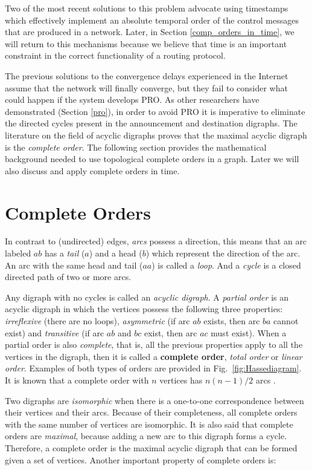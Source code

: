 \documentclass[5p,twocolumn]{elsarticle}
\begin{document}
Two of the most recent solutions to this problem \cite{Pei2005, Chandrashekar2005} advocate using timestamps which effectively implement an absolute temporal order of the control messages that are produced in a network. Later, in Section \ref{comp_orders_in_time}, we will return to this mechanisms because we believe that time is an important constraint in the correct functionality of a routing protocol.

The previous solutions to the convergence delays experienced in the Internet assume that the network will finally converge, but they fail to consider what could happen if the system develops PRO. As other researchers have demonstrated (Section \ref{pro}), in order to avoid PRO it is imperative to eliminate the directed cycles present in the announcement and destination digraphs. The literature on the field of acyclic digraphs \cite{Harary1965, Bang-Jensen2002} proves that the maximal acyclic digraph is the \emph{complete order}. The following section provides the mathematical background needed to use topological complete orders in a graph. Later we will also discuss and apply complete orders in time.




\section{Complete Orders}\label{comp_orders}
In contrast to (undirected) edges, \emph{arcs} possess a direction, this means that an arc labeled $ab$ has a \emph{tail} ($a$) and a head ($b$) which represent the direction of the arc. An arc with the same head and tail ($aa$) is called a \emph{loop}. And a \emph{cycle} is a closed directed path of two or more arcs.

Any digraph with no cycles is called an \emph{acyclic digraph}. A \emph{partial order} is an acyclic digraph in which the vertices possess the following three properties: \emph{irreflexive} (there are no loops), \emph{asymmetric} (if arc $ab$ exists, then arc $ba$ cannot exist) and \emph{transitive} (if arc $ab$ and $bc$ exist, then arc $ac$ must exist). When a partial order is also \emph{complete}, that is, all the previous properties apply to all the vertices in the digraph, then it is called a \textbf{complete order}, \emph{total order} or \emph{linear order}. Examples of both types of orders are provided in Fig.\ \ref{fig:Hassediagram}. It is known that a complete order with $n$ vertices has $n(n-1)/2$ arcs \cite{Harary1965}.

Two digraphs are \emph{isomorphic} when there is a one-to-one correspondence between their vertices and their arcs. Because of their completeness, all complete orders with the same number of vertices are isomorphic. It is also said that complete orders are \emph{maximal}, because adding a new arc to this digraph forms a cycle. Therefore, a complete order is the maximal acyclic digraph that can be formed given a set of vertices. Another important property of complete orders is:
\end{document}
